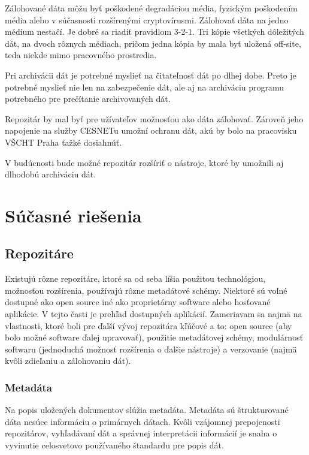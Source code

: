 \documentclass[thesis=M,slovak]{FITthesis}[2013/05/06]
\begin{document}
Zálohované dáta môžu byť poškodené degradáciou média, fyzickým poškodením média alebo v súčasnosti rozšírenými cryptovírusmi. Zálohovať dáta na jedno médium nestačí. Je dobré sa riadiť pravidlom 3-2-1. Tri kópie všetkých dôležitých dát, na dvoch rôznych médiach, pričom jedna kópia by mala byť uložená off-site, teda niekde mimo pracovného prostredia. \cite{zalohovanie}

Pri archivácii dát je potrebné myslieť na čitateľnosť dát po dlhej dobe. Preto je potrebné myslieť nie len na zabezpečenie dát, ale aj na archiváciu programu potrebného pre prečítanie archivovaných dát.

Repozitár by mal byť pre užívateľov možnosťou ako dáta zálohovať. Zároveň jeho napojenie na služby CESNETu umožní ochranu dát, akú by bolo na pracovisku VŠCHT Praha ťažké dosiahnúť.

V budúcnosti bude možné repozitár rozšíriť o nástroje, ktoré by umožnili aj dlhodobú archiváciu dát.

\chapter{Súčasné riešenia}
\section{Repozitáre}
Existujú rôzne repozitáre, ktoré sa od seba líšia použitou technológiou, možnosťou rozšírenia, používajú rôzne metadátové schémy. Niektoré sú voľné dostupné ako open source iné ako proprietárny software alebo hosťované aplikácie. V tejto časti je prehľad dostupných aplikácií. Zameriavam sa najmä na vlastnosti, ktoré boli pre ďalší vývoj repozitára kľúčové a to: open source (aby bolo možné software ďalej upravovať), použitie metadátovej schémy, modulárnosť softwaru (jednoduchá možnosť rozšírenia o ďalšie nástroje) a verzovanie (najmä kvôli zdieľaniu a zálohovaniu dát).


\subsection{Metadáta}
Na popis uložených dokumentov slúžia metadáta. Metadáta sú štrukturované dáta nesúce informáciu o primárnych dátach.\cite{iso8459-5} Kvôli vzájomnej prepojenosti repozitárov, vyhľadávaní dát a správnej interpretácii informácií je snaha o vyvinutie celosvetovo používaného štandardu pre popis dát.
\end{document}
